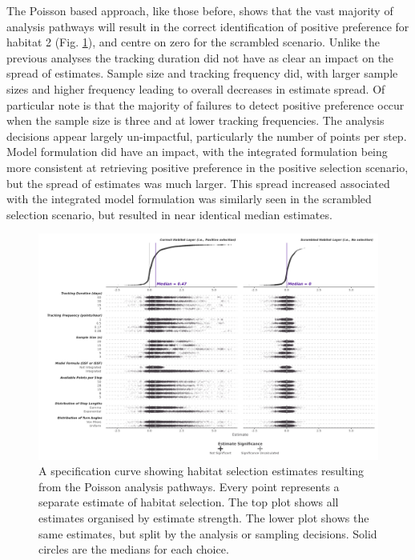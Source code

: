 \documentclass[10pt,a4paper]{article}
\begin{document}
The Poisson based approach, like those before, shows that the vast majority of analysis pathways will result in the correct identification of positive preference for habitat 2 (Fig. \ref{fig:specCurvePois}), and centre on zero for the scrambled scenario.
Unlike the previous analyses the tracking duration did not have as clear an impact on the spread of estimates.
Sample size and tracking frequency did, with larger sample sizes and higher frequency leading to overall decreases in estimate spread.
Of particular note is that the majority of failures to detect positive preference occur when the sample size is three and at lower tracking frequencies.
The analysis decisions appear largely un-impactful, particularly the number of points per step.
Model formulation did have an impact, with the integrated formulation being more consistent at retrieving positive preference in the positive selection scenario, but the spread of estimates was much larger.
This spread increased associated with the integrated model formulation was similarly seen in the scrambled selection scenario, but resulted in near identical median estimates.

\begin{figure}
\includegraphics[width=1\linewidth]{../figures/pois_specCurve} \caption{A specification curve showing habitat selection estimates resulting from the Poisson analysis pathways. Every point represents a separate estimate of habitat selection. The top plot shows all estimates organised by estimate strength. The lower plot shows the same estimates, but split by the analysis or sampling decisions. Solid circles are the medians for each choice.}\label{fig:specCurvePois}
\end{figure}
\end{document}
